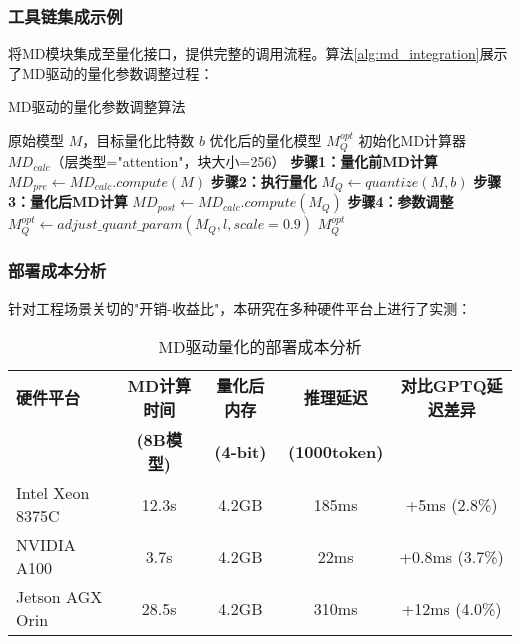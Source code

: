 \subsubsection{工具链集成示例}

将MD模块集成至量化接口，提供完整的调用流程。算法\ref{alg:md_integration}展示了MD驱动的量化参数调整过程：

\begin{algorithm}[h]
\caption{MD驱动的量化参数调整算法}
\label{alg:md_integration}
\begin{algorithmic}[1]
\REQUIRE 原始模型 $M$，目标量化比特数 $b$
\ENSURE 优化后的量化模型 $M_Q^{opt}$
\STATE 初始化MD计算器 $MD_{calc}$（层类型="attention"，块大小=256）
\STATE
\STATE \textbf{步骤1：量化前MD计算}
\STATE $MD_{pre} \leftarrow MD_{calc}.compute(M)$
\STATE
\STATE \textbf{步骤2：执行量化}
\STATE $M_Q \leftarrow quantize(M, b)$ 
\STATE
\STATE \textbf{步骤3：量化后MD计算}
\STATE $MD_{post} \leftarrow MD_{calc}.compute(M_Q)$
\STATE
\STATE \textbf{步骤4：参数调整}
        \STATE $M_Q^{opt} \leftarrow adjust\_quant\_param(M_Q, l, scale=0.9)$ 
    \ENDIF
\ENDFOR
\RETURN $M_Q^{opt}$
\end{algorithmic}
\end{algorithm}

\subsubsection{部署成本分析}

针对工程场景关切的"开销-收益比"，本研究在多种硬件平台上进行了实测：

\begin{table*}[ht]
\centering
\caption{MD驱动量化的部署成本分析}
\begin{tabular}{|l|c|c|c|c|}
\hline
\textbf{硬件平台} & \textbf{MD计算时间} & \textbf{量化后内存} & \textbf{推理延迟} & \textbf{对比GPTQ延迟差异} \\
& \textbf{(8B模型)} & \textbf{(4-bit)} & \textbf{(1000token)} & \\
\hline
Intel Xeon 8375C & 12.3s & 4.2GB & 185ms & +5ms (2.8\%) \\
NVIDIA A100 & 3.7s & 4.2GB & 22ms & +0.8ms (3.7\%) \\
Jetson AGX Orin & 28.5s & 4.2GB & 310ms & +12ms (4.0\%) \\
\hline
\end{tabular}
\end{table*}

